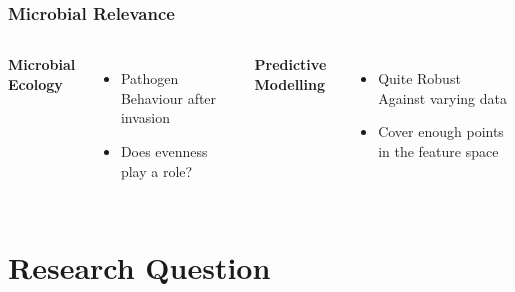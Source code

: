\documentclass{beamer}
\begin{document}

\begin{frame}
\frametitle{Microbial Relevance}
\begin{columns}[c] %

\textbf{Microbial Ecology}
\begin{itemize}
\item Pathogen Behaviour after invasion
\item Does evenness play a role?
 
\end{itemize}

\textbf{Predictive Modelling}
\begin{itemize}
\item Quite Robust Against varying data
\item Cover enough points in the feature space
 
\end{itemize}
\end{columns}
\end{frame}


\section{Research Question}
\end{document}
